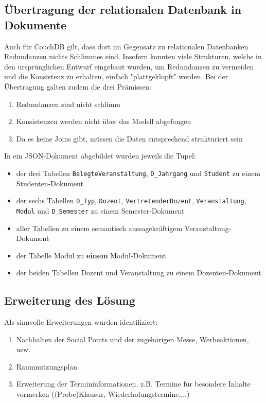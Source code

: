 \vspace{18pt}

\subsection{Übertragung der relationalen Datenbank in Dokumente}
Auch für CouchDB gilt, dass dort im Gegensatz zu relationalen Datenbanken Redundanzen nichts Schlimmes sind. Insofern konnten viele Strukturen, welche in den ursprünglichen Entwurf eingebaut wurden, um Redundanzen
zu vermeiden und die Konsistenz zu erhalten, einfach "plattgeklopft" werden.
Bei der Übertragung galten zudem die drei Prämissen:
\begin{enumerate}
    \item Redundanzen sind nicht schlimm
    \item Konsistenzen werden nicht über das Modell abgefangen
    \item  Da es keine Joins gibt, müssen die Daten entsprechend strukturiert sein
\end{enumerate}
In ein JSON-Dokument abgebildet wurden jeweils die Tupel:
\begin{itemize}
    \item der drei Tabellen \texttt{BelegteVeranstaltung}, \texttt{D\_Jahrgang} und \texttt{Student} zu einem Studenten-Dokument
    \item der sechs Tabellen \texttt{D\_Typ}, \texttt{Dozent}, \texttt{VertretenderDozent}, \texttt{Veranstaltung}, \texttt{Modul} und \texttt{D\_Semester} zu einem Semester-Dokument
    \item aller Tabellen zu einem semantisch aussagekräftigem Veranstaltung-Dokument
    \item der Tabelle Modul zu \textbf{einem} Modul-Dokument
    \item der beiden Tabellen Dozent und Veranstaltung zu einem Dozenten-Dokument
\end{itemize}

\vspace{18pt}

\subsection{Erweiterung des Lösung}
Als sinnvolle Erweiterungen wurden identifiziert:
\begin{enumerate}
    \item Nachhalten der Social Points und der zugehörigen Messe, Werbeaktionen, usw.
    \item Raumnutzungsplan
    \item Erweiterung der Termininformationen, z.B. Termine für besondere Inhalte vormerken ((Probe)Klausur, Wiederholungstermine,...)
\end{enumerate}

